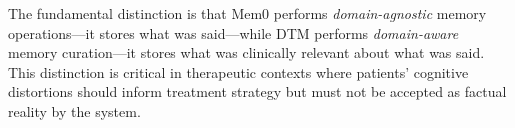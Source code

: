 The fundamental distinction is that Mem0 performs \emph{domain-agnostic} memory operations---it stores what was said---while DTM performs \emph{domain-aware} memory curation---it stores what was clinically relevant about what was said. This distinction is critical in therapeutic contexts where patients' cognitive distortions should inform treatment strategy but must not be accepted as factual reality by the system.
